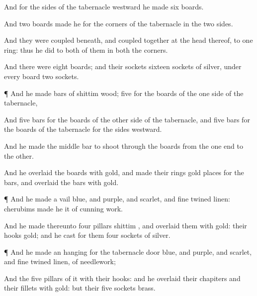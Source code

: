 {And for the
sides of the
tabernacle
westward he
made
six
boards.

And
two
boards
made he for the
corners of the
tabernacle in the two
sides.

And they were
coupled
beneath, and
coupled
together at the
head thereof, to
one
ring: thus he
did to
both of them in
both the
corners.

And there were
eight
boards; and their
sockets
{}
sixteen
sockets of
silver, under
every
board
two
sockets.


\par }{\PP {}¶ And he
made
bars of
shittim
wood;
five for the
boards of the
one
side of the
tabernacle,

And
five
bars for the
boards of the
other
side of the
tabernacle, and
five
bars for the
boards of the
tabernacle for the
sides
westward.

And he
made the
middle
bar to
shoot
through the
boards from the one
end to the
other.

And he
overlaid the
boards with
gold, and
made their
rings
{}
gold
{}
places for the
bars, and
overlaid the
bars with
gold.


\par }{\PP {}¶ And he
made a
vail
{}
blue, and
purple, and
scarlet, and fine
twined
linen:
{}
cherubims
made he it of
cunning
work.

And he
made thereunto
four
pillars
{}
shittim
{}, and
overlaid them with
gold: their
hooks
{}
gold; and he
cast for them
four
sockets of
silver.


\par }{\PP {}¶ And he
made an
hanging for the
tabernacle
door
{}
blue, and
purple, and
scarlet, and fine
twined
linen, of
needlework;

And the
five
pillars of it with their
hooks: and he
overlaid their
chapiters and their
fillets with
gold: but their
five
sockets
{}
brass.




\par }
